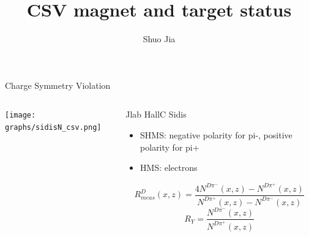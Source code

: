 \documentclass[aspectratio=169,xcolor=dvipsnames]{beamer}
\title{CSV magnet and target status}
\date{}
\author{Shuo Jia}
\begin{document}
\maketitle


%

\begin{frame}{Charge Symmetry Violation}
  \begin{columns}
    \begin{column}[T]{0.5\textwidth}
      \texttt{[image: graphs/sidisN\_csv.png]}
    \end{column}
    \begin{column}[T]{0.5\textwidth}
      Jlab HallC Sidis
      \begin{itemize}
        \item SHMS: negative polarity for pi-, positive polarity for pi+
         \item HMS: electrons
      \end{itemize}
\begin{equation}\label{R_measure}
    R^D_{meas}(x,z) = \frac{4N^{D\pi^-}(x,z) - N^{D\pi^+}(x,z)}{N^{D\pi^+}(x,z)-N^{D\pi^-}(x,z)}
\end{equation}
\begin{equation}
  R_Y = \frac{N^{D \pi^-}(x,z)}{N^{D\pi^+}(x,z)}
\end{equation}
    \end{column}
  \end{columns}
\end{frame}
\end{document}
